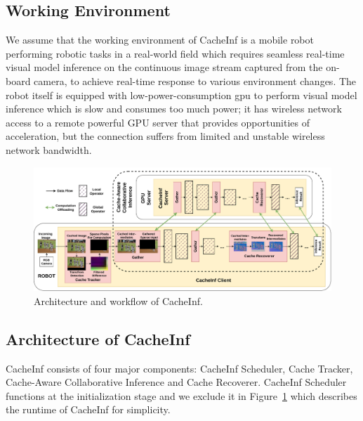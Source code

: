 
\subsection{Working Environment}
We assume that the working environment of CacheInf is a mobile robot performing robotic tasks in a real-world field which requires seamless real-time visual model inference on the continuous image stream captured from the on-board camera, to achieve real-time response to various environment changes.
The robot itself is equipped with low-power-consumption gpu to perform visual model inference which is slow and consumes too much power; it has wireless network access to a remote powerful GPU server that provides opportunities of acceleration, but the connection suffers from limited and unstable wireless network bandwidth.


\begin{figure}[!htb]
    \centering
    \includegraphics[width=0.98\linewidth]{fig/overview_new.drawio.pdf}
    \caption[track]{Architecture and workflow of CacheInf.}
    \label{fig:overview}
\end{figure}

\subsection{Architecture of CacheInf}
CacheInf consists of four major components: CacheInf Scheduler, Cache Tracker, Cache-Aware Collaborative Inference and Cache Recoverer.
CacheInf Scheduler functions at the initialization stage and we exclude it in Figure~\ref{fig:overview} which describes the runtime of CacheInf for simplicity.


